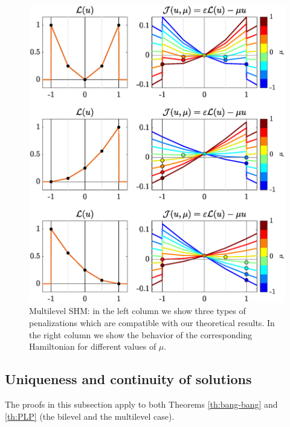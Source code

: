 \documentclass[9pt,shortpaper,twoside,web]{ieeecolor}
\begin{document}
\begin{figure}[h]
	\includegraphics[scale=0.415]{img/fig04.eps}
	\caption{Multilevel SHM: in the left column we show three types of penalizations which are compatible with our theoretical results. In the right column we show the behavior of the corresponding Hamiltonian for different values of $\mu$. } 
	\label{fig:several_hamiltonian}
\end{figure} 

\subsection{Uniqueness and continuity of solutions}\label{sec: uniqueness continuity}

The proofs in this subsection apply to both Theorems \ref{th:bang-bang} and \ref{th:PLP} (the bilevel and the multilevel case).
\end{document}
